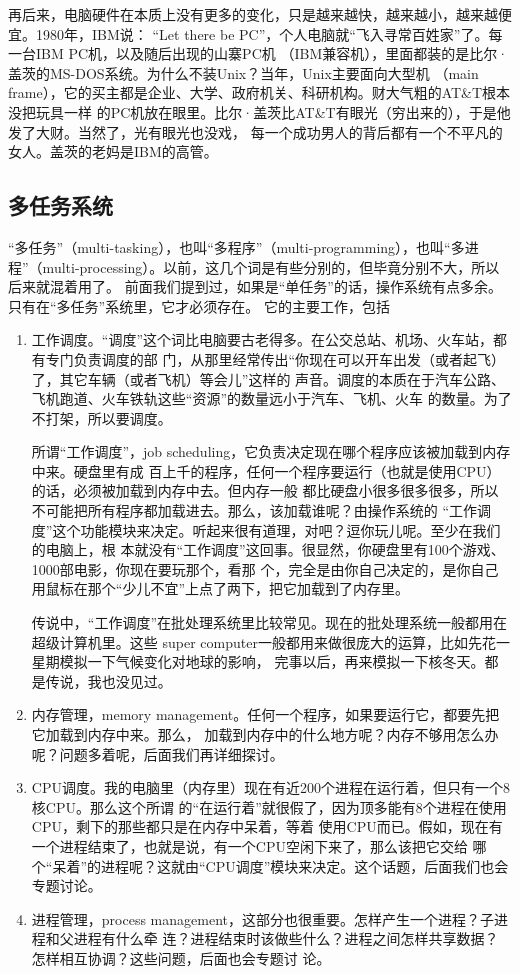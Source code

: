 \documentclass{wx672ctexart}
\newcommand\mpic[1]{%
  \marginpar{\texttt{[image: thumbnails/\#1]}}}
\begin{document}
再后来，电脑硬件在本质上没有更多的变化，只是越来越快，越来越小，越来越便宜。1980年，IBM说：
“Let there be PC”，个人电脑就“飞入寻常百姓家”了。每一台IBM PC机，以及随后出现的山寨PC机
（IBM兼容机），里面都装的是比尔·盖茨的MS-DOS系统。为什么不装Unix？当年，Unix主要面向大型机
（main frame），它的买主都是企业、大学、政府机关、科研机构。财大气粗的AT\&T根本没把玩具一样
的PC机放在眼里。比尔·盖茨比AT\&T有眼光（穷出来的），于是他发了大财。当然了，光有眼光也没戏，
每一个成功男人的背后都有一个不平凡的女人。盖茨的老妈是IBM的高管。

\subsection{多任务系统}
\label{sec:orged5e015}\mpic{pg_0014}
“多任务”（multi-tasking），也叫“多程序”（multi-programming），也叫“多进
程”（multi-processing）。以前，这几个词是有些分别的，但毕竟分别不大，所以后来就混着用了。
前面我们提到过，如果是“单任务”的话，操作系统有点多余。只有在“多任务”系统里，它才必须存在。
它的主要工作，包括
\begin{enumerate}
\item 工作调度。“调度”这个词比电脑要古老得多。在公交总站、机场、火车站，都有专门负责调度的部
门，从那里经常传出“你现在可以开车出发（或者起飞）了，其它车辆（或者飞机）等会儿”这样的
声音。调度的本质在于汽车公路、飞机跑道、火车铁轨这些“资源”的数量远小于汽车、飞机、火车
的数量。为了不打架，所以要调度。

所谓“工作调度”，job scheduling，它负责决定现在哪个程序应该被加载到内存中来。硬盘里有成
百上千的程序，任何一个程序要运行（也就是使用CPU）的话，必须被加载到内存中去。但内存一般
都比硬盘小很多很多很多，所以不可能把所有程序都加载进去。那么，该加载谁呢？由操作系统的
“工作调度”这个功能模块来决定。听起来很有道理，对吧？逗你玩儿呢。至少在我们的电脑上，根
本就没有“工作调度”这回事。很显然，你硬盘里有100个游戏、1000部电影，你现在要玩那个，看那
个，完全是由你自己决定的，是你自己用鼠标在那个“少儿不宜”上点了两下，把它加载到了内存里。

传说中，“工作调度”在批处理系统里比较常见。现在的批处理系统一般都用在超级计算机里。这些
super computer一般都用来做很庞大的运算，比如先花一星期模拟一下气候变化对地球的影响，
完事以后，再来模拟一下核冬天。都是传说，我也没见过。
\item 内存管理，memory management。任何一个程序，如果要运行它，都要先把它加载到内存中来。那么，
加载到内存中的什么地方呢？内存不够用怎么办呢？问题多着呢，后面我们再详细探讨。
\item CPU调度。我的电脑里（内存里）现在有近200个进程在运行着，但只有一个8核CPU。那么这个所谓
的“在运行着”就很假了，因为顶多能有8个进程在使用CPU，剩下的那些都只是在内存中呆着，等着
使用CPU而已。假如，现在有一个进程结束了，也就是说，有一个CPU空闲下来了，那么该把它交给
哪个“呆着”的进程呢？这就由“CPU调度”模块来决定。这个话题，后面我们也会专题讨论。
\item 进程管理，process management，这部分也很重要。怎样产生一个进程？子进程和父进程有什么牵
连？进程结束时该做些什么？进程之间怎样共享数据？怎样相互协调？这些问题，后面也会专题讨
论。
\end{enumerate}
\end{document}
